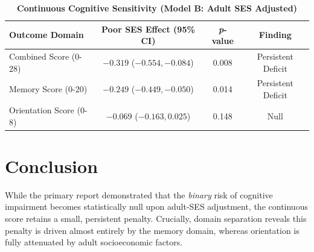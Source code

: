 \documentclass[12pt]{article}
\begin{document}
\begin{table}[H]
\centering
\small
\caption{\textbf{Continuous Cognitive Sensitivity (Model B: Adult SES Adjusted)}}
\begin{tabular}{lccc}
\toprule
\textbf{Outcome Domain} & \textbf{Poor SES Effect (95\% CI)} & \textbf{\textit{p}-value} & \textbf{Finding} \\
\midrule
Combined Score (0-28) & $-0.319$ ($-0.554, -0.084$) & 0.008 & Persistent Deficit \\
Memory Score (0-20) & $-0.249$ ($-0.449, -0.050$) & 0.014 & Persistent Deficit \\
Orientation Score (0-8) & $-0.069$ ($-0.163, 0.025$) & 0.148 & Null \\
\bottomrule
\end{tabular}
\end{table}

\section{Conclusion}
While the primary report demonstrated that the \textit{binary} risk of cognitive impairment becomes statistically null upon adult-SES adjustment, the continuous score retains a small, persistent penalty. Crucially, domain separation reveals this penalty is driven almost entirely by the memory domain, whereas orientation is fully attenuated by adult socioeconomic factors.
\end{document}
